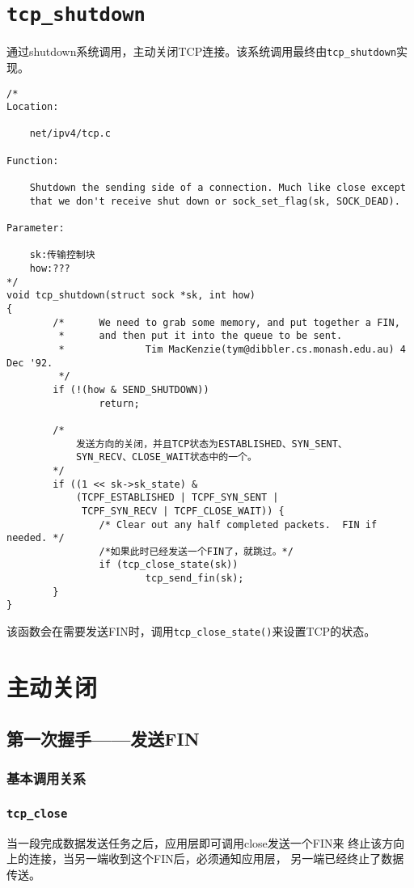 \section{\texttt{tcp_shutdown}}
			\label{ClientSendFin:tcp_shutdown}
			通过shutdown系统调用，主动关闭TCP连接。该系统调用最终由\texttt{tcp_shutdown}实现。
\begin{verbatim}
/*
Location:

	net/ipv4/tcp.c

Function:

	Shutdown the sending side of a connection. Much like close except
	that we don't receive shut down or sock_set_flag(sk, SOCK_DEAD).

Parameter:

	sk:传输控制块
	how:???
*/
void tcp_shutdown(struct sock *sk, int how)
{
        /*      We need to grab some memory, and put together a FIN,
         *      and then put it into the queue to be sent.
         *              Tim MacKenzie(tym@dibbler.cs.monash.edu.au) 4 Dec '92.
         */
        if (!(how & SEND_SHUTDOWN))
                return;

        /*
			发送方向的关闭，并且TCP状态为ESTABLISHED、SYN_SENT、
			SYN_RECV、CLOSE_WAIT状态中的一个。
		*/
        if ((1 << sk->sk_state) &
            (TCPF_ESTABLISHED | TCPF_SYN_SENT |
             TCPF_SYN_RECV | TCPF_CLOSE_WAIT)) {
                /* Clear out any half completed packets.  FIN if needed. */
				/*如果此时已经发送一个FIN了，就跳过。*/                
				if (tcp_close_state(sk))
                        tcp_send_fin(sk);
        }
}
\end{verbatim}
	
	该函数会在需要发送FIN时，调用\texttt{tcp_close_state()}来设置TCP的状态。

\section{主动关闭}
\label{Actively Close}

	\subsection{第一次握手——发送FIN}
		\subsubsection{基本调用关系}
		
		\subsubsection{\texttt{tcp_close}}
			当一段完成数据发送任务之后，应用层即可调用close发送一个FIN来
			终止该方向上的连接，当另一端收到这个FIN后，必须通知应用层，
			另一端已经终止了数据传送。


